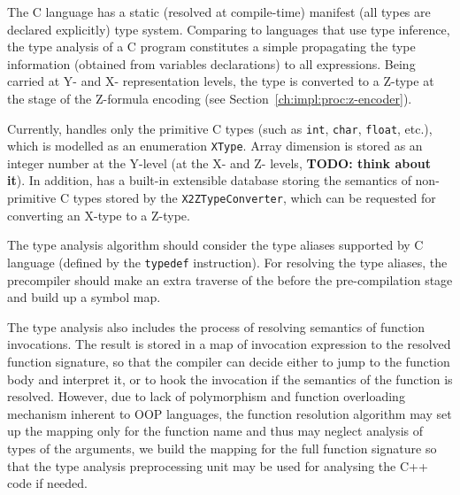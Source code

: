 The C language has a static (resolved at compile-time) manifest (all types are declared explicitly) type system.
Comparing to languages that use type inference, the type analysis of a C program constitutes a simple propagating the type information (obtained from variables declarations) to all expressions. %
Being carried at Y- and X- representation levels, the type is converted to a Z-type at the stage of the Z-formula encoding (see Section~\ref{ch:impl:proc:z-encoder}).

Currently, \porthos[2] handles only the primitive C types (such as \texttt{int}, \texttt{char}, \texttt{float}, etc.), which is modelled as an enumeration \texttt{XType}. %
Array dimension is stored as an integer number at the Y-level (at the X- and Z- levels, \textbf{TODO: think about it}). %
In addition, \porthos[2] has a built-in extensible database storing the semantics of non-primitive C types stored by the \texttt{X2ZTypeConverter}, %
which can be requested for converting an X-type to a Z-type. %


The type analysis algorithm should consider the type aliases supported by C language (defined by the \texttt{typedef} instruction).
For resolving the type aliases, the precompiler should make an extra traverse of the \ytree{} before the pre-compilation stage and build up a symbol map.

The type analysis also includes the process of resolving semantics of function invocations.
The result is stored in a map of invocation expression to the resolved function signature, so that the compiler can decide either to jump to the function body and interpret it, or to hook the invocation if the semantics of the function is resolved.
However, due to lack of polymorphism and function overloading mechanism inherent to OOP languages, the function resolution algorithm may set up the mapping only for the function name and thus may neglect analysis of types of the arguments, we build the mapping for the full function signature so that the type analysis preprocessing unit may be used for analysing the C++ code if needed.



